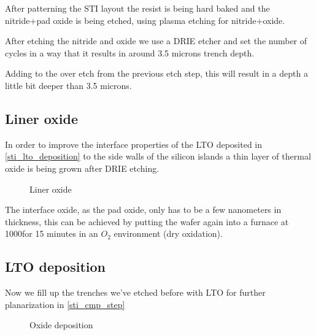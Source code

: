 After patterning the STI layout the resist is being hard baked and the nitride+pad oxide is being etched, using plasma etching for nitride+oxide.

After etching the nitride and oxide we use a DRIE etcher and set the number of cycles in a way that it results in around 3.5 microns trench depth.

Adding to the over etch from the previous etch step, this will result in a depth a little bit deeper than 3.5 microns.

\newpage

\subsection{Liner oxide}\label{sti_liner_oxide}

In order to improve the interface properties of the LTO deposited in \autoref{sti_lto_deposition} to the side walls of the silicon islands a thin layer of thermal oxide is being grown after DRIE etching.

\begin{figure}[H]
	\centering
	\begin{tikzpicture}[node distance = 3cm, auto, thick,scale=\CrossSectionOnly, every node/.style={transform shape}]
		
	\end{tikzpicture}
	\drawStepArrow{}
	\begin{tikzpicture}[node distance = 3cm, auto, thick,scale=\CrossSectionOnly, every node/.style={transform shape}]
		
	\end{tikzpicture}
	\caption{Liner oxide}
\end{figure}

The interface oxide, as the pad oxide, only has to be a few nanometers in thickness, this can be achieved by putting the wafer again into a furnace at 1000\degreesC for 15 minutes in an $O_2$ environment (dry oxidation).

\subsection{LTO deposition}\label{sti_lto_deposition}

Now we fill up the trenches we've etched before with LTO for further planarization in \autoref{sti_cmp_step}

\begin{figure}[H]
	\centering
	\begin{tikzpicture}[node distance = 3cm, auto, thick,scale=\CrossSectionOnly, every node/.style={transform shape}]
		
	\end{tikzpicture}
	\begin{tikzpicture}[node distance = 3cm, auto, thick,scale=\CrossSectionOnly, every node/.style={transform shape}]
		
	\end{tikzpicture}
	\caption{Oxide deposition}
\end{figure}

